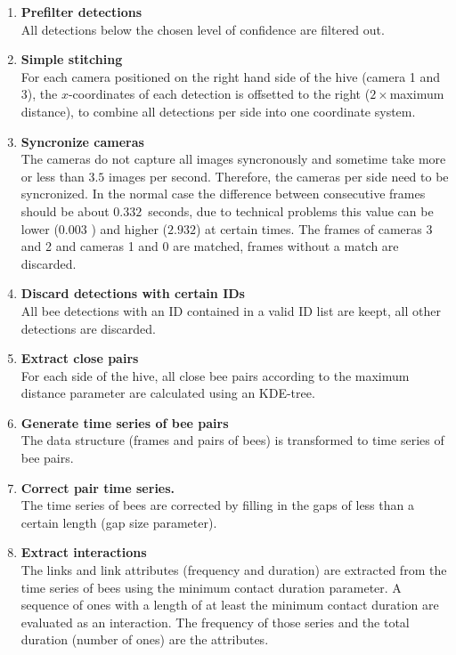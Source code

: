 \begin{enumerate}
\item \textbf{Prefilter detections}\\
All detections below the chosen level of confidence are filtered out.

\item \textbf{Simple stitching}\\
For each camera positioned on the right hand side of the hive (camera 1 and 3), the $x$-coordinates of each detection is offsetted to the right ($2\times$maximum distance), to combine all detections per side into one coordinate system.

\item \textbf{Syncronize cameras}\\
The cameras do not capture all images syncronously and sometime take more or less than $3.5$ images per second.
Therefore, the cameras per side need to be syncronized. In the normal case the difference between consecutive frames should be about $0.332$~seconds, due to technical problems this value can be lower ($0.003$ ) and higher ($2.932$) at certain times. The frames of cameras 3 and 2 and cameras 1 and 0 are matched, frames without a match are discarded.

\item \textbf{Discard detections with certain IDs}\\
All bee detections with an ID contained in a valid ID list are keept, all other detections are discarded.

\item \textbf{Extract close pairs}\\
For each side of the hive, all close bee pairs according to the maximum distance parameter are calculated using an KDE-tree.

\item \textbf{Generate time series of bee pairs}\\
The data structure (frames and pairs of bees) is transformed to time series of bee pairs.

\item \textbf{Correct pair time series.}\\
The time series of bees are corrected by filling in the gaps of less than a certain length (gap size parameter).

\item \textbf{Extract interactions}\\
The links and link attributes (frequency and duration) are extracted from the time series of bees using the minimum contact duration parameter.
A sequence of ones with a length of at least the minimum contact duration are evaluated as an interaction.
The frequency of those series and the total duration (number of ones) are the attributes.
\end{enumerate}


